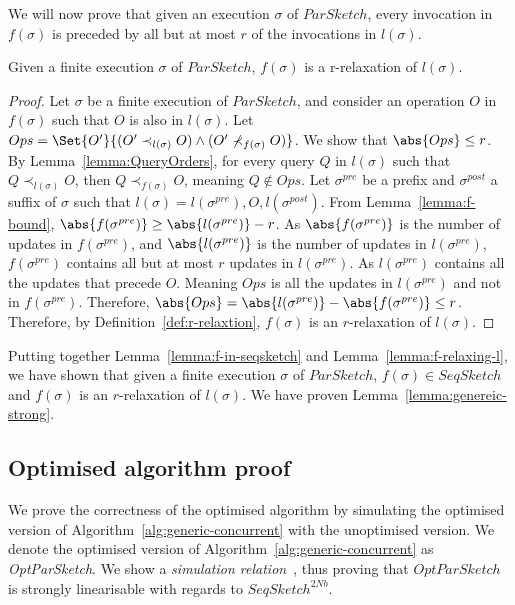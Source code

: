 We will now prove that given an execution $\sigma$ of $ParSketch$, every invocation in $f(\sigma)$
is preceded by all but at most $r$ of the invocations in $l(\sigma)$.
\begin{lemma}
    Given a finite execution $\sigma$ of $ParSketch$, $f(\sigma)$ is a r-relaxation of $l(\sigma)$.
    \label{lemma:f-relaxing-l}
\end{lemma}
\begin{proof}
    Let $\sigma$ be a finite execution of $ParSketch$, and consider an operation $O$ in $f(\sigma)$
    such that $O$ is also in $l(\sigma)$. Let $Ops = \Set{O'}{(O' \prec_{l(\sigma)} O) \wedge (O' \nprec_{f(\sigma)} O)}$.
    We show that $\abs{Ops} \leq r$.
    By Lemma~\ref{lemma:QueryOrders}, for every query $Q$ in $l(\sigma)$ such that $Q \prec_{l(\sigma)} O$,
    then $Q \prec_{f(\sigma)} O$, meaning $Q \notin Ops$.
    Let $\sigma^{pre}$ be a prefix and $\sigma^{post}$ a suffix of $\sigma$ such that
    $l(\sigma)=l(\sigma^{pre}),O,l(\sigma^{post})$. From Lemma~\ref{lemma:f-bound}, $\abs{f(\sigma^{pre})} \geq \abs{l(\sigma^{pre})} - r$.
    As $\abs{f(\sigma^{pre})}$ is the number of updates in $f(\sigma^{pre})$, and $\abs{l(\sigma^{pre})}$ is the number of updates
    in $l(\sigma^{pre})$, $f(\sigma^{pre})$ contains all but at most $r$ updates in $l(\sigma^{pre})$. As $l(\sigma^{pre})$
    contains all the updates that precede $O$. Meaning $Ops$ is all the updates in $l(\sigma^{pre})$ and not in
    $f(\sigma^{pre})$. Therefore, $\abs{Ops} = \abs{l(\sigma^{pre})} - \abs{f(\sigma^{pre})} \leq r$.
    Therefore, by Definition~\ref{def:r-relaxtion}, $f(\sigma)$ is an $r$-relaxation of $l(\sigma)$.
\end{proof}

Putting together Lemma~\ref{lemma:f-in-seqsketch} and Lemma~\ref{lemma:f-relaxing-l}, we have shown that
given a finite execution $\sigma$ of $ParSketch$, $f(\sigma) \in SeqSketch$ and $f(\sigma)$ is an $r$-relaxation
of $l(\sigma)$. We have proven Lemma~\ref{lemma:genereic-strong}.

\subsection{Optimised algorithm proof}
\label{subsec:Optimised-algorithm-proof}
We prove the correctness of the optimised algorithm by simulating the optimised version of 
Algorithm~\ref{alg:generic-concurrent} with the unoptimised version.
We denote the optimised version of Algorithm~\ref{alg:generic-concurrent} as 
\emph{OptParSketch}. We show a \emph{simulation relation}~\cite{lynch1996distributed},
thus proving that $OptParSketch$ is strongly linearisable with regards to $SeqSketch^{2Nb}$.

